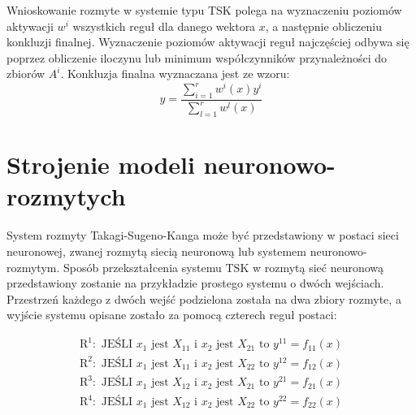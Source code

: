 \documentclass[a4paper,12pt,titlepage]{article}
\begin{document}
Wnioskowanie rozmyte w systemie typu TSK polega na wyznaczeniu poziomów aktywacji $w^i$ wszystkich reguł dla danego wektora $x$, a następnie obliczeniu konkluzji finalnej. Wyznaczenie poziomów aktywacji reguł najczęściej odbywa się poprzez obliczenie iloczynu lub minimum współczynników przynależności do zbiorów $A^i$. Konkluzja finalna wyznaczana jest ze wzoru:
\begin{equation}
y = \frac{\sum_{i=1}^r w^i(x)y^i}{\sum_{l=1}^r w^l(x)}
\label{wzor1}
\end{equation}

\section{Strojenie modeli neuronowo-rozmytych}

System rozmyty Takagi-Sugeno-Kanga może być przedstawiony w postaci sieci neuronowej, zwanej rozmytą siecią neuronową lub systemem neuronowo-rozmytym. Sposób przekształcenia systemu TSK w rozmytą sieć neuronową przedstawiony zostanie na przykładzie prostego systemu o dwóch wejściach. Przestrzeń każdego z dwóch wejść podzielona została na dwa zbiory rozmyte, a wyjście systemu opisane zostało za pomocą czterech reguł postaci:

\begin{displaymath}
\begin{array}{l}
\mathrm{R}^1:\mbox{ JEŚLI } x_1 \mbox{ jest } X_{11} \mbox{ i } x_2 \mbox{ jest } X_{21} \mbox{ to } y^{11}=f_{11}(x) \\
\mathrm{R}^2:\mbox{ JEŚLI } x_1 \mbox{ jest } X_{11} \mbox{ i } x_2 \mbox{ jest } X_{22} \mbox{ to } y^{12}=f_{12}(x) \\
\mathrm{R}^3:\mbox{ JEŚLI } x_1 \mbox{ jest } X_{12} \mbox{ i } x_2 \mbox{ jest } X_{21} \mbox{ to } y^{21}=f_{21}(x) \\
\mathrm{R}^4:\mbox{ JEŚLI } x_1 \mbox{ jest } X_{12} \mbox{ i } x_2 \mbox{ jest } X_{22} \mbox{ to } y^{22}=f_{22}(x) \\
\end{array}
\end{displaymath}
\end{document}
